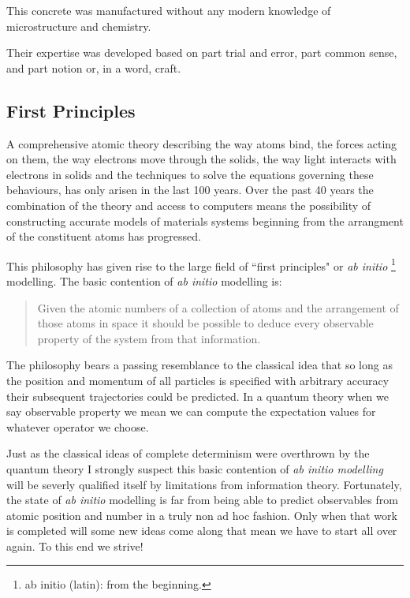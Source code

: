 This concrete was manufactured without any modern knowledge of microstructure and 
chemistry.
%

Their expertise was developed based on part trial and error, 
part common sense, and part notion or, in a word, craft.

\subsection{First Principles}
A comprehensive atomic theory describing the way atoms bind, the forces acting on them, 
the way electrons move through the solids, the way light interacts with electrons in solids
and the techniques to solve the equations governing these behaviours, has only 
arisen in the last 100 years. 
%
Over the past 40 years the combination of the theory and access to computers 
means the possibility of constructing accurate models of materials 
systems beginning from the arrangment of the constituent atoms has
progressed. 
%

This philosophy has given rise to the large field of ``first principles" or {\it ab initio} 
\footnote{ab initio (latin): from the beginning.} modelling. 
%
The basic contention of {\it ab initio} modelling is:  

\begin{quote}
Given the atomic numbers of a collection of atoms 
and the arrangement of those atoms in space 
it should be possible to deduce every
observable property of the system from that information.
\end{quote}

The philosophy bears a passing resemblance to the classical idea
that so long as the position and momentum of all particles 
is specified with arbitrary accuracy their subsequent 
trajectories could be predicted. In a quantum theory
when we say observable property we mean we can compute
the expectation values for whatever operator we choose.

Just as the classical ideas of complete determinism were
overthrown by the quantum theory I strongly suspect this
basic contention of {\it ab initio modelling} 
will be severly qualified itself by
limitations from information theory. Fortunately, the 
state of {\it ab initio} modelling is far from being
able to predict observables from atomic position and number
in a truly non ad hoc fashion. Only when that work is completed
will some new ideas come along that mean we have to start all over
again. To this end we strive!

